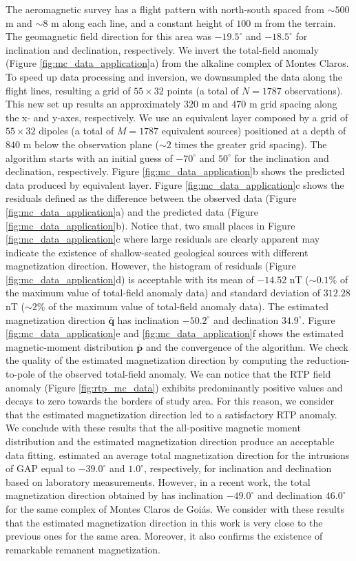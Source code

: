 The aeromagnetic survey has a flight pattern with north-south spaced from $\sim 500$ m and $ \sim 8$ m along each line, and a constant height of $100$ m from the terrain. The geomagnetic field direction for this area was $-19.5^\circ$ and $-18.5^\circ$ for inclination and declination, respectively. We invert the total-field anomaly (Figure \ref{fig:mc_data_application}a) from the alkaline complex of Montes Claros. To speed up data processing and inversion, we downsampled the data along the flight lines, resulting a grid of $55 \times 32$ points (a total of $N=1787$ observations). This new set up results an approximately $320$ m and $470$ m grid spacing along the x- and y-axes, respectively. We use an equivalent layer composed by a grid of $55 \times 32$ dipoles (a total of $M=1787$ equivalent sources) positioned at a depth of $840$ m below the observation plane ($\sim 2$ times the greater grid spacing). The algorithm starts with an initial guess of $-70^\circ$ and $50^\circ$ for the inclination and declination, respectively. Figure \ref{fig:mc_data_application}b shows the predicted data produced by equivalent layer. Figure \ref{fig:mc_data_application}c shows the residuals defined as the difference between the observed data (Figure \ref{fig:mc_data_application}a) and the predicted data (Figure \ref{fig:mc_data_application}b). Notice that, two small places in Figure \ref{fig:mc_data_application}c where large residuals are clearly apparent may indicate the existence of shallow-seated geological sources with different magnetization direction. However, the histogram of residuals (Figure \ref{fig:mc_data_application}d) is acceptable with its mean of $-14.52$ nT ($\sim 0.1\% $ of the maximum value of total-field anomaly data) and standard deviation of $312.28$ nT ($\sim 2 \% $ of the maximum value of total-field anomaly data). The estimated magnetization direction $\bar{\mathbf{q}}$ has inclination $-50.2^\circ$ and declination $34.9^\circ$. Figure \ref{fig:mc_data_application}e and \ref{fig:mc_data_application}f shows the estimated magnetic-moment distribution $\bar{\mathbf{p}}$ and the convergence of the algorithm. We check the quality of the estimated magnetization direction by computing the reduction-to-pole of the observed total-field anomaly. We can notice that the RTP field anomaly (Figure \ref{fig:rtp_mc_data}) exhibits predominantly positive values and decays to zero towards the borders of study area. For this reason, we consider that the estimated magnetization direction led to a satisfactory RTP anomaly. We conclude with these results that the all-positive magnetic moment distribution and the estimated magnetization direction produce an acceptable data fitting. \cite{marangoni_mantovani_2013} estimated an average total magnetization direction for the intrusions of GAP equal to $-39.0^\circ$ and $1.0^\circ$, respectively, for inclination and declination based on laboratory measurements. However, in a recent work, the total magnetization direction obtained by \cite{zhang_etal_2018} has inclination $-49.0^\circ$ and declination $46.0^\circ$ for the same complex of Montes Claros de Goi\'as. We consider with these results that the estimated magnetization direction in this work is very close to the previous ones for the same area. Moreover, it also confirms the existence of remarkable remanent magnetization. 


